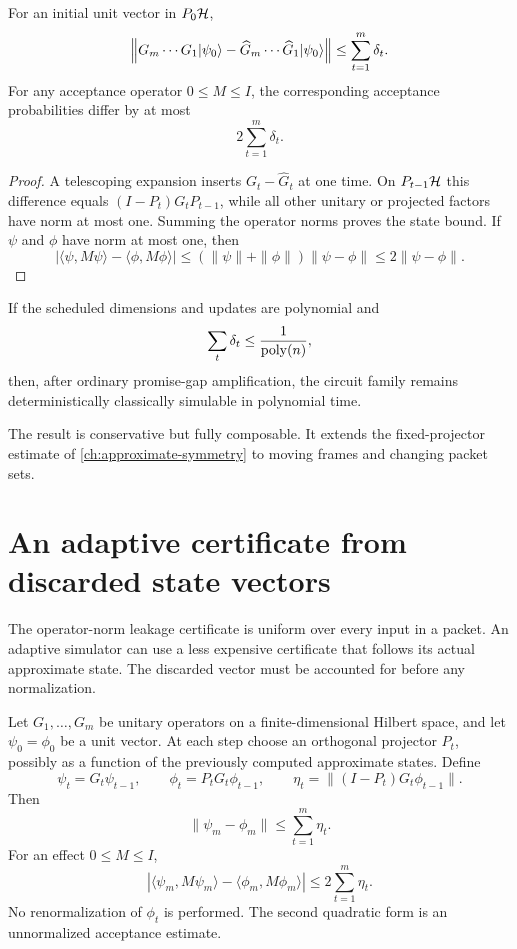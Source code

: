 \begin{theorem}
\label{thm:dynamic-leakage}
For an initial unit vector in $P_0\mathcal H$,
\[
\left\|
G_m\cdots G_1\lvert \psi_0\rangle
-
\widehat G_m\cdots\widehat G_1\lvert \psi_0\rangle
\right\|
\le
\sum_{t=1}^{m}\delta_t.
\]
For any acceptance operator $0\le M\le I$, the corresponding acceptance probabilities differ by at most
\[
2\sum_{t=1}^{m}\delta_t.
\]
\end{theorem}

\begin{proof}
A telescoping expansion inserts $G_t-\widehat G_t$ at one time. On $P_{t-1}\mathcal H$ this difference equals $(I-P_t)G_tP_{t-1}$, while all other unitary or projected factors have norm at most one. Summing the operator norms proves the state bound. If $\psi$ and $\phi$ have norm at most one, then
\[
|\langle\psi,M\psi\rangle-\langle\phi,M\phi\rangle|
\le
(\|\psi\|+\|\phi\|)\|\psi-\phi\|
\le2\|\psi-\phi\|.
\]
\end{proof}

\begin{corollary}
If the scheduled dimensions and updates are polynomial and
\[
\sum_t\delta_t\le\frac1{\operatorname{poly}(n)},
\]
then, after ordinary promise-gap amplification, the circuit family remains deterministically classically simulable in polynomial time.
\end{corollary}

The result is conservative but fully composable. It extends the fixed-projector estimate of \cref{ch:approximate-symmetry} to moving frames and changing packet sets.


\section{An adaptive certificate from discarded state vectors}
The operator-norm leakage certificate is uniform over every input in a packet. An adaptive simulator can use a less expensive certificate that follows its actual approximate state. The discarded vector must be accounted for before any normalization.

\begin{theorem}
\label{thm:adaptive-discarded-state}
Let $G_1,\ldots,G_m$ be unitary operators on a finite-dimensional Hilbert space, and let $\psi_0=\phi_0$ be a unit vector. At each step choose an orthogonal projector $P_t$, possibly as a function of the previously computed approximate states. Define
\[
\psi_t=G_t\psi_{t-1},\qquad
\phi_t=P_tG_t\phi_{t-1},\qquad
\eta_t=\|(I-P_t)G_t\phi_{t-1}\|.
\]
Then
\[
\|\psi_m-\phi_m\|\le\sum_{t=1}^m\eta_t.
\]
For an effect $0\le M\le I$,
\[
\left|\langle\psi_m,M\psi_m\rangle-\langle\phi_m,M\phi_m\rangle\right|
\le2\sum_{t=1}^m\eta_t.
\]
No renormalization of $\phi_t$ is performed. The second quadratic form is an unnormalized acceptance estimate.
\end{theorem}

